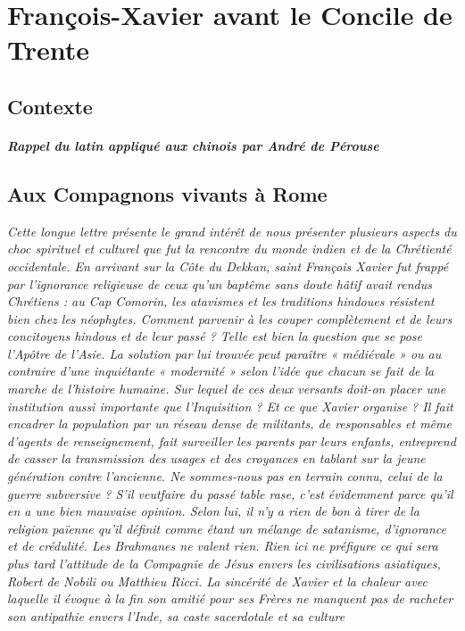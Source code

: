 \chapter{François-Xavier avant le Concile de Trente}


\section{Contexte}

\paragraph{Rappel du latin appliqué aux chinois par André de Pérouse}



\section{Aux Compagnons vivants à Rome}

\textit{Cette longue lettre présente le grand intérêt de nous présenter
plusieurs aspects du choc spirituel et culturel que fut la rencontre
du monde indien et de la Chrétienté occidentale. En arrivant sur
la Côte du Dekkan, saint François Xavier fut frappé par l'ignorance
religieuse de ceux qu'un baptême sans doute hâtif avait rendus
Chrétiens : au Cap Comorin, les atavismes et les traditions hindoues résistent bien chez les néophytes. Comment parvenir à les
couper complètement et de leurs concitoyens hindous et de leur
passé ? Telle est bien la question que se pose l'Apôtre de l'Asie.
La solution par lui trouvée peut paraître « médiévale » ou au
contraire d'une inquiétante « modernité » selon l'idée que chacun
se fait de la marche de l'histoire humaine. Sur lequel de ces deux
versants doit-on placer une institution aussi importante que l'Inquisition
? Et ce que Xavier organise ? Il fait encadrer la population
par un réseau dense de militants, de responsables et même d'agents
de renseignement, fait surveiller les parents par leurs enfants, entreprend
de casser la transmission des usages et des croyances en
tablant sur la jeune génération contre l'ancienne. Ne sommes-nous
pas en terrain connu, celui de la guerre subversive ? S'il veutfaire
du passé table rase, c'est évidemment parce qu'il en a une bien
mauvaise opinion. Selon lui, il n'y a rien de bon à tirer de la religion
païenne qu'il définit comme étant un mélange de satanisme,
d'ignorance et de crédulité. Les Brahmanes ne valent rien. Rien ici
ne préfigure ce qui sera plus tard l'attitude de la Compagnie de
Jésus envers les civilisations asiatiques, Robert de Nobili ou Matthieu
Ricci. La sincérité de Xavier et la chaleur avec laquelle il évoque
à la fin son amitié pour ses Frères ne manquent pas de racheter
son antipathie envers l'Inde, sa caste sacerdotale et sa culture}



